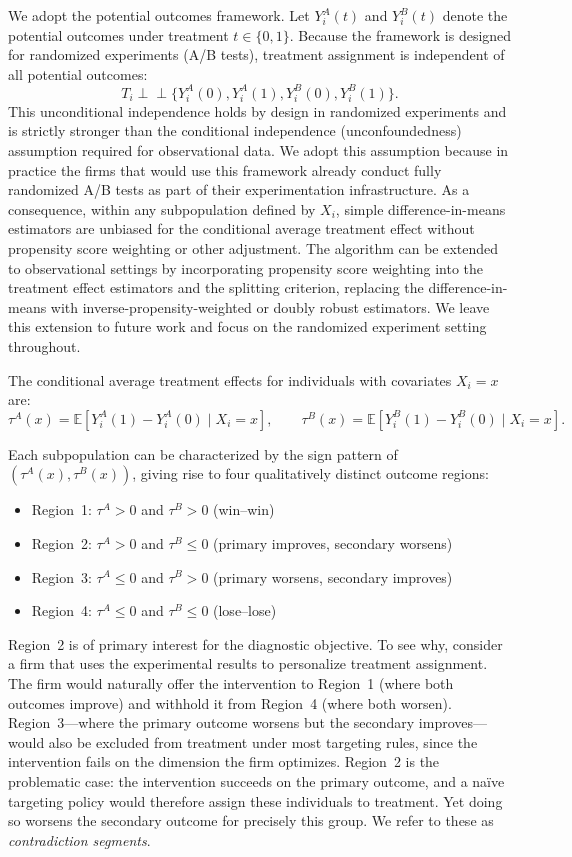 \documentclass[11pt,letterpaper,english]{article}
\theoremstyle{definition}
\theoremstyle{definition}
\begin{document}
\begin{bibunit}
We adopt the potential outcomes framework. Let $Y_i^A(t)$ and $Y_i^B(t)$ denote the potential outcomes under treatment $t \in \{0,1\}$. Because the framework is designed for randomized experiments (A/B tests), treatment assignment is independent of all potential outcomes:
\[
T_i \perp\!\!\!\perp \{Y_i^A(0), Y_i^A(1), Y_i^B(0), Y_i^B(1)\}.
\]
This unconditional independence holds by design in randomized experiments and is strictly stronger than the conditional independence (unconfoundedness) assumption required for observational data. We adopt this assumption because in practice the firms that would use this framework already conduct fully randomized A/B tests as part of their experimentation infrastructure. As a consequence, within any subpopulation defined by $X_i$, simple difference-in-means estimators are unbiased for the conditional average treatment effect without propensity score weighting or other adjustment. The algorithm can be extended to observational settings by incorporating propensity score weighting into the treatment effect estimators and the splitting criterion, replacing the difference-in-means with inverse-propensity-weighted or doubly robust estimators. We leave this extension to future work and focus on the randomized experiment setting throughout.

The conditional average treatment effects for individuals with covariates $X_i = x$ are:
\[
\tau^A(x) = \mathbb{E}[Y_i^A(1) - Y_i^A(0) \mid X_i = x], \qquad
\tau^B(x) = \mathbb{E}[Y_i^B(1) - Y_i^B(0) \mid X_i = x].
\]

Each subpopulation can be characterized by the sign pattern of $(\tau^A(x), \tau^B(x))$, giving rise to four qualitatively distinct outcome regions:
\begin{itemize}[leftmargin=2em]
    \item Region~1: $\tau^A > 0$ and $\tau^B > 0$ \hfill (win--win)
    \item Region~2: $\tau^A > 0$ and $\tau^B \leq 0$ \hfill (primary improves, secondary worsens)
    \item Region~3: $\tau^A \leq 0$ and $\tau^B > 0$ \hfill (primary worsens, secondary improves)
    \item Region~4: $\tau^A \leq 0$ and $\tau^B \leq 0$ \hfill (lose--lose)
\end{itemize}

Region~2 is of primary interest for the diagnostic objective. To see why, consider a firm that uses the experimental results to personalize treatment assignment. The firm would naturally offer the intervention to Region~1 (where both outcomes improve) and withhold it from Region~4 (where both worsen). Region~3---where the primary outcome worsens but the secondary improves---would also be excluded from treatment under most targeting rules, since the intervention fails on the dimension the firm optimizes. Region~2 is the problematic case: the intervention succeeds on the primary outcome, and a na\"ive targeting policy would therefore assign these individuals to treatment. Yet doing so worsens the secondary outcome for precisely this group. We refer to these as \emph{contradiction segments}.


\end{bibunit}
\end{document}
